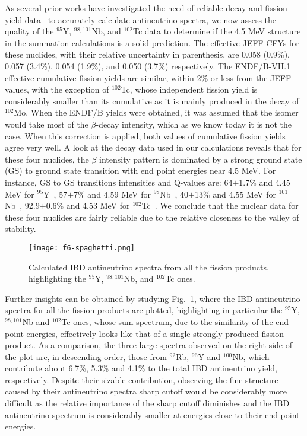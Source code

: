 \documentclass[twocolumn,amsmath,amssymb,10pt,superscriptaddress,a4paper,letterpaper,fleqn]{revtex4-1}
\begin{document}
As several prior works have investigated the need of reliable decay and fission yield data~\cite{fallot12,sonzogni15,rasco16} to accurately calculate 
antineutrino spectra,
we now assess the quality of the  $^{95}$Y, $^{98,101}$Nb, and $^{102}$Tc data
to determine if the 4.5 MeV structure 
in the summation calculations is a solid prediction.  
The effective JEFF CFYs for these nuclides, 
with their relative uncertainty in parenthesis, are  0.058 (0.9\%), 0.057 (3.4\%), 0.054 (1.9\%), and  0.050 (3.7\%) respectively.  
The ENDF/B-VII.1 effective cumulative fission yields are similar, within 2\% or less from the JEFF values, with the exception of $^{102}$Tc, whose 
independent fission yield is considerably smaller than its cumulative as it is mainly produced in the decay of $^{102}$Mo.   
When the ENDF/B yields were obtained, it was assumed that the isomer would take most of the $\beta$-decay intensity, which as we know today it is not the case.
When this correction is applied, both values of cumulative fission yields agree very well.
A look at the decay data used in our calculations reveals that for these four nuclides, the $\beta$ intensity pattern is dominated by 
a strong ground state (GS) to ground state transition with end point energies near 4.5 MeV.
For instance, GS to GS transitions intensities and Q-values are: 
64$\pm$1.7\% and 4.45 MeV for $^{95}$Y~\cite{a95},
 57$\pm$7\% and 4.59 MeV for $^{98}$Nb~\cite{a98},
40$\pm$13\% and 4.55 MeV for $^{101}$Nb~\cite{a101},
92.9$\pm$0.6\% and 4.53 MeV for $^{102}$Tc~\cite{a102,jordan13}.
We conclude that the nuclear data for these four nuclides are fairly reliable due to the relative
closeness to the valley of stability.   



\begin{figure}[t] 
\texttt{[image: f6-spaghetti.png]}
\caption{
Calculated IBD antineutrino spectra from all the fission products, highlighting
 the $^{95}$Y, $^{98,101}$Nb, and $^{102}$Tc ones.
}
\label{f.spaghetti}
\end{figure}   

Further insights  can be obtained by studying Fig.~\ref{f.spaghetti}, where the IBD antineutrino spectra for all the fission products
are plotted, highlighting in particular the $^{95}$Y, $^{98,101}$Nb  and $^{102}$Tc ones, whose sum spectrum, due to the similarity of the end-point energies,
 effectively looks like that of a single strongly produced fission product.  As a comparison,
the three large spectra observed on the right
side of the plot are, in descending order, those from
$^{92}$Rb, $^{96}$Y and $^{100}$Nb, which contribute about 6.7\%, 5.3\% and 4.1\% to the total IBD antineutrino yield, respectively.   
Despite their sizable contribution, observing the fine structure caused
by their antineutrino spectra sharp cutoff would be considerably 
more difficult as the relative importance of the sharp cutoff diminishes and the IBD antineutrino spectrum is considerably smaller at energies close to their end-point energies. 
\end{document}
